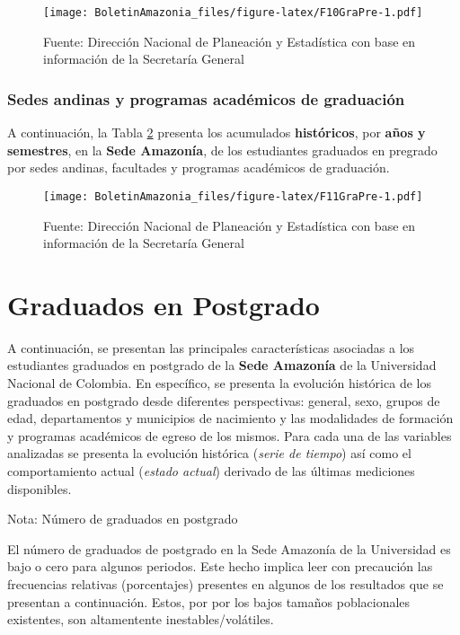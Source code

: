 \documentclass[
]{book}
\begin{document}
\begin{figure}
\centering
\texttt{[image: BoletinAmazonia\_files/figure-latex/F10GraPre-1.pdf]}
\caption{\label{fig:F10GraPre}Fuente: Dirección Nacional de Planeación y Estadística con base en información de la Secretaría General}
\end{figure}

\hypertarget{sedes-andinas-y-programas-acaduxe9micos-de-graduaciuxf3n}{%
\subsubsection{Sedes andinas y programas académicos de graduación}\label{sedes-andinas-y-programas-acaduxe9micos-de-graduaciuxf3n}}

A continuación, la Tabla \ref{fig:F11GraPre} presenta los acumulados \textbf{históricos}, por \textbf{años y semestres}, en la \textbf{Sede Amazonía}, de los estudiantes graduados en pregrado por sedes andinas, facultades y programas académicos de graduación.

\begin{figure}
\centering
\texttt{[image: BoletinAmazonia\_files/figure-latex/F11GraPre-1.pdf]}
\caption{\label{fig:F11GraPre}Fuente: Dirección Nacional de Planeación y Estadística con base en información de la Secretaría General}
\end{figure}

\hypertarget{GraPos}{%
\section{Graduados en Postgrado}\label{GraPos}}

A continuación, se presentan las principales características asociadas a los estudiantes graduados en postgrado de la \textbf{Sede Amazonía} de la Universidad Nacional de Colombia. En específico, se presenta la evolución histórica de los graduados en postgrado desde diferentes perspectivas: general, sexo, grupos de edad, departamentos y municipios de nacimiento y las modalidades de formación y programas académicos de egreso de los mismos. Para cada una de las variables analizadas se presenta la evolución histórica (\emph{serie de tiempo}) así como el comportamiento actual (\emph{estado actual}) derivado de las últimas mediciones disponibles.

Nota: Número de graduados en postgrado

El número de graduados de postgrado en la Sede Amazonía de la Universidad es bajo o cero para algunos periodos. Este hecho implica leer con precaución las frecuencias relativas (porcentajes) presentes en algunos de los resultados que se presentan a continuación. Estos, por por los bajos tamaños poblacionales existentes, son altamentente inestables/volátiles.
\end{document}

